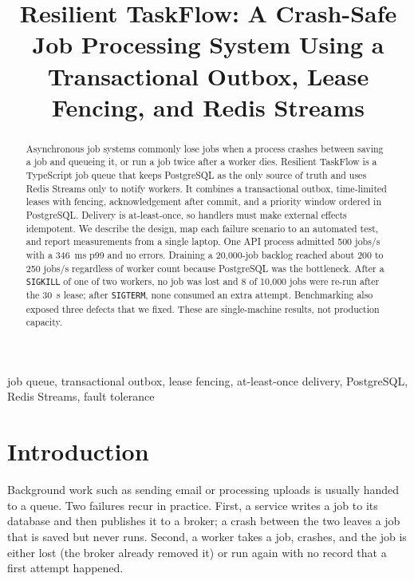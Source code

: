 \documentclass[conference]{IEEEtran}
\newcommand{\code}[1]{\texttt{\small #1}}
\begin{document}
\title{Resilient TaskFlow: A Crash-Safe Job Processing System Using a Transactional Outbox, Lease Fencing, and Redis Streams}

\author{
}

\maketitle

\begin{abstract}
Asynchronous job systems commonly lose jobs when a process crashes between saving a job and queueing it, or run a job twice after a worker dies. Resilient TaskFlow is a TypeScript job queue that keeps PostgreSQL as the only source of truth and uses Redis Streams only to notify workers. It combines a transactional outbox, time-limited leases with fencing, acknowledgement after commit, and a priority window ordered in PostgreSQL. Delivery is at-least-once, so handlers must make external effects idempotent. We describe the design, map each failure scenario to an automated test, and report measurements from a single laptop. One API process admitted 500 jobs/s with a 346~ms p99 and no errors. Draining a 20{,}000-job backlog reached about 200 to 250 jobs/s regardless of worker count because PostgreSQL was the bottleneck. After a \code{SIGKILL} of one of two workers, no job was lost and 8 of 10{,}000 jobs were re-run after the 30~s lease; after \code{SIGTERM}, none consumed an extra attempt. Benchmarking also exposed three defects that we fixed. These are single-machine results, not production capacity.
\end{abstract}

\begin{IEEEkeywords}
job queue, transactional outbox, lease fencing, at-least-once delivery, PostgreSQL, Redis Streams, fault tolerance
\end{IEEEkeywords}

\section{Introduction}
Background work such as sending email or processing uploads is usually handed to a queue. Two failures recur in practice. First, a service writes a job to its database and then publishes it to a broker; a crash between the two leaves a job that is saved but never runs. Second, a worker takes a job, crashes, and the job is either lost (the broker already removed it) or run again with no record that a first attempt happened.
\end{document}
